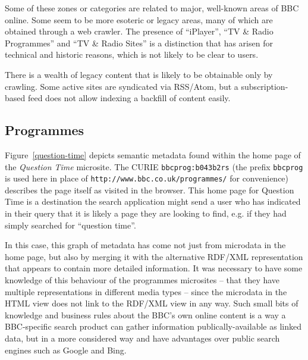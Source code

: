 Some of these zones or categories are related to major, well-known areas of
BBC online. Some seem to be more esoteric or legacy areas, many of which
are obtained through a web crawler. The presence of ``iPlayer'',
``TV \& Radio Programmes'' and ``TV \& Radio Sites'' is a distinction that
has arisen for technical and historic reasons, which is not likely to be
clear to users.

There is a wealth of legacy content that is likely to be obtainable only by
crawling. Some active sites are syndicated via RSS/Atom, but a subscription-based
feed does not allow indexing a backfill of content easily.

\subsection{Programmes}
\label{programmes}

Figure~\ref{question-time} depicts semantic metadata found within the home page
of the \emph{Question Time} microsite. The CURIE\cite{birbeck2009curie}
\texttt{bbcprog:b043b2rs} (the prefix \texttt{bbcprog} is used here in place
of \texttt{http://www.bbc.co.uk/programmes/} for convenience)
describes the page itself as visited in the
browser. This home page for Question Time is a destination the search
application might send a user who has indicated in their query that it
is likely a page they are looking to find, e.g. if they had simply
searched for ``question time''.

In this case, this graph of metadata has come not just from microdata
in the home page, but also by merging it with the alternative RDF/XML
representation that appears to contain more detailed information.
It was necessary to have some knowledge of this behaviour of the
programmes microsites -- that they have multiple representations
in different media types -- since the microdata in the HTML view
does not link to the RDF/XML view in any way. Such small bits of
knowledge and business rules about the BBC's own online content
is a way a BBC-specific search product can gather information publically-available
as linked data, but in a more considered way and have advantages over
public search engines such as Google and Bing.

\begin{sidewaysfigure}
  \begin{center}
    \begin{dot2tex}[dot,pgf,scale=0.25]
      
    \end{dot2tex}
  \end{center}
  \caption{Semantic metadata found within \emph{Question Time} home page}
  \label{question-time}
\end{sidewaysfigure}


